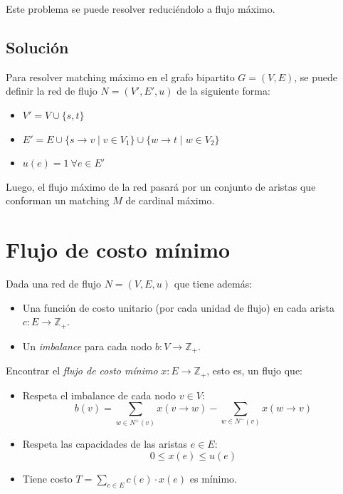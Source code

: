 \documentclass[a4paper]{report}
\newcommand{\Z}{\mathbb{Z}}
\begin{document}
Este problema se puede resolver reduciéndolo a flujo máximo.

\subsection{Solución}

Para resolver matching máximo en el grafo bipartito $G = (V, E)$, se puede definir la red de flujo $N =(V', E', u)$ de la siguiente forma:
\begin{itemize}
    \item $V' = V \cup \{s, t\}$
    \item $E' = E \cup \{s \rightarrow v \mid v \in V_1\} \cup \{w \rightarrow t \mid w \in V_2\}$
    \item $u(e) = 1\ \forall e \in E'$
\end{itemize}

Luego, el flujo máximo de la red pasará por un conjunto de aristas que conforman un matching $M$ de cardinal máximo.


\section{Flujo de costo mínimo}

\begin{problema}
    Dada una red de flujo $N = (V, E, u)$ que tiene además:
    \begin{itemize}
        \item Una función de costo unitario (por cada unidad de flujo) en cada arista $c: E \rightarrow \Z_+$.
        \item Un \textit{imbalance} para cada nodo $b: V \rightarrow \Z_+$.
    \end{itemize}
    
    Encontrar el \textit{flujo de costo mínimo} $x: E \rightarrow \Z_+$, esto es, un flujo que:
    \begin{itemize}
        \item Respeta el imbalance de cada nodo $v \in V$:
            $$b(v) = \sum_{w \in N^+(v)} x(v \rightarrow w) - \sum_{w \in N^-(v)} x(w \rightarrow v)$$
        \item Respeta las capacidades de las aristas $e \in E$:
            $$0 \leq x(e) \leq u(e)$$
        \item Tiene costo $T = \sum_{e \in E} c(e) \cdot x(e)$ es mínimo.
    \end{itemize}
\end{problema}
\end{document}
